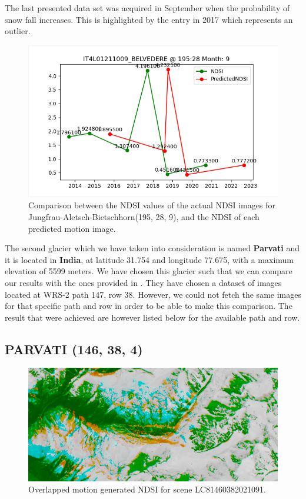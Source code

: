 \documentclass[12pt, a4paper]{report}
\begin{document}
	The last presented data set was acquired in September when the probability of snow fall increases. This is highlighted by the entry in 2017 which represents an outlier.
	
	\begin{figure}[h!]
		\centering
		\includegraphics[scale=0.5]{../images/experiment_195289.png}
		\caption{Comparison between the NDSI values of the actual NDSI images for Jungfrau-Aletsch-Bietschhorn(195, 28, 9), and the NDSI of each predicted motion image.}
		\label{fig:jungfrau_195289}
	\end{figure}
	
	\vfill
	\newpage{}
	
	\par The second glacier which we have taken into consideration is named \textbf{Parvati} and it is located in \textbf{India}, at latitude 31.754 and longitude 77.675, with a maximum elevation of 5599 meters. We have chosen this glacier such that we can compare our results with the ones provided in \cite{TAK2020}. They have chosen a dataset of images located at WRS-2 path 147, row 38. However, we could not fetch the same images for that specific path and row in order to be able to make this comparison. The result that were achieved are however listed below for the available path and row.
	
	\subsection{PARVATI (146, 38, 4)}
		
	\begin{figure}[h!]
		\centering
		\includegraphics[width=\linewidth]{../images/experiment_1460384_image.png}
		\caption{Overlapped motion generated NDSI for scene LC81460382021091.}
		\label{fig:experiment_1460384_image}
	\end{figure}
\end{document}
